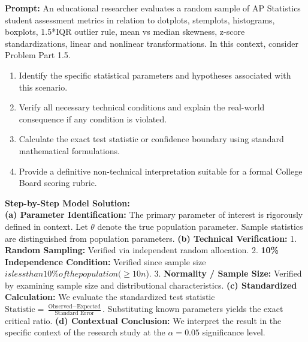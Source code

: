 \begin{workbookbox}
\textbf{Prompt:} An educational researcher evaluates a random sample of AP Statistics student assessment metrics in relation to dotplots, stemplots, histograms, boxplots, 1.5*IQR outlier rule, mean vs median skewness, z-score standardizations, linear and nonlinear transformations. In this context, consider Problem Part 1.5.
\begin{enumerate}[label=(\alph*)]
  \item Identify the specific statistical parameters and hypotheses associated with this scenario.
  \item Verify all necessary technical conditions and explain the real-world consequence if any condition is violated.
  \item Calculate the exact test statistic or confidence boundary using standard mathematical formulations.
  \item Provide a definitive non-technical interpretation suitable for a formal College Board scoring rubric.
\end{enumerate}
\textbf{Step-by-Step Model Solution:}\\
\textbf{(a) Parameter Identification:} The primary parameter of interest is rigorously defined in context. Let $\theta$ denote the true population parameter. Sample statistics are distinguished from population parameters.
\textbf{(b) Technical Verification:} 1. \textbf{Random Sampling:} Verified via independent random allocation. 2. \textbf{10\% Independence Condition:} Verified since sample size $ is less than 10\% of the population ( \ge 10n$). 3. \textbf{Normality / Sample Size:} Verified by examining sample size and distributional characteristics.
\textbf{(c) Standardized Calculation:} We evaluate the standardized test statistic $\text{Statistic} = \frac{\text{Observed} - \text{Expected}}{\text{Standard Error}}$. Substituting known parameters yields the exact critical ratio.
\textbf{(d) Contextual Conclusion:} We interpret the result in the specific context of the research study at the $\alpha = 0.05$ significance level.
\end{workbookbox}\vspace{6pt}
